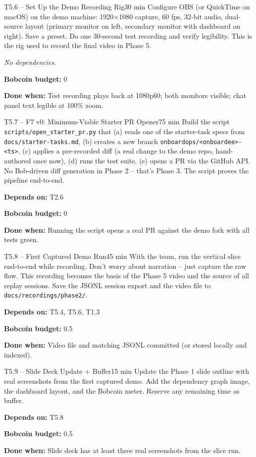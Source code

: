 \documentclass[11pt,letterpaper]{article}
\newcommand{\acceptance}[1]{\par\smallskip\textcolor{ibmgreen}{\textbf{Done when:}} #1}
\newcommand{\depends}[1]{\par\smallskip\textcolor{ibmorange}{\textbf{Depends on:}} #1}
\newcommand{\nodep}{\par\smallskip\textcolor{ibmgray}{\textit{No dependencies.}}}
\newcommand{\bobcost}[1]{\par\smallskip\textcolor{ibmaccent}{\textbf{Bobcoin budget:}} #1}
\begin{document}
\begin{task}{T5.6 -- Set Up the Demo Recording Rig}{30 min}
Configure OBS (or QuickTime on macOS) on the demo machine: 1920$\times$1080 capture, 60 fps, 32-bit audio, dual-source layout (primary monitor on left, secondary monitor with dashboard on right). Save a preset. Do one 30-second test recording and verify legibility. This is the rig used to record the final video in Phase 5.
\nodep
\bobcost{0}
\acceptance{Test recording plays back at 1080p60; both monitors visible; chat panel text legible at 100\% zoom.}
\end{task}

\begin{task}{T5.7 -- F7 v0: Minimum-Viable Starter PR Opener}{75 min}
Build the script \texttt{scripts/open\_starter\_pr.py} that (a) reads one of the starter-task specs from \texttt{docs/starter-tasks.md}, (b) creates a new branch \texttt{onboardops/<onboardee>-<ts>}, (c) applies a pre-recorded diff (a real change to the demo repo, hand-authored once now), (d) runs the test suite, (e) opens a PR via the GitHub API. No Bob-driven diff generation in Phase 2 -- that's Phase 3. The script proves the pipeline end-to-end.
\depends{T2.6}
\bobcost{0}
\acceptance{Running the script opens a real PR against the demo fork with all tests green.}
\end{task}

\begin{task}{T5.8 -- First Captured Demo Run}{45 min}
With the team, run the vertical slice end-to-end while recording. Don't worry about narration -- just capture the raw flow. This recording becomes the basis of the Phase 5 video and the source of all replay sessions. Save the JSONL session export and the video file to \texttt{docs/recordings/phase2/}.
\depends{T5.4, T5.6, T1.3}
\bobcost{0.5}
\acceptance{Video file and matching JSONL committed (or stored locally and indexed).}
\end{task}

\begin{task}{T5.9 -- Slide Deck Update + Buffer}{15 min}
Update the Phase 1 slide outline with real screenshots from the first captured demo. Add the dependency graph image, the dashboard layout, and the Bobcoin meter. Reserve any remaining time as buffer.
\depends{T5.8}
\bobcost{0.5}
\acceptance{Slide deck has at least three real screenshots from the slice run.}
\end{task}

\end{document}
